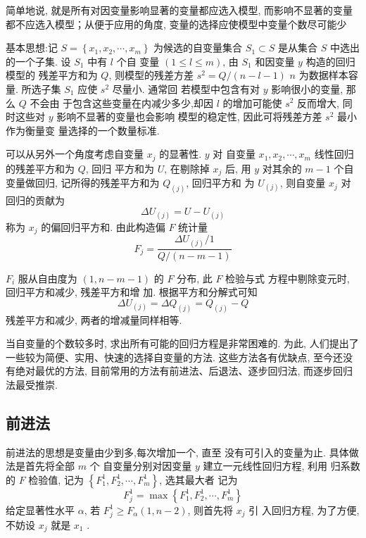 简单地说, 就是所有对因变量影响显著的变量都应选入模型, 而影响不显著的变量都不应选入模型；从便于应用的角度, 变量的选择应使模型中变量个数尽可能少

基本思想:记 \( {S}=\left\{{x}_{1}, {x}_{2}, \cdots, {x}_{m}\right\} \) 为候选的自变量集合
\( {S}_{1} \subset {S} \) 是从集合 \( {S} \) 中选出的一个子集. 设 \( {S}_{1} \) 中有 \( {l} \) 个自
变量 \( (1 \leq l \leq m) \), 由 \( S_{1} \) 和因变量 \( y \) 构造的回归模型的 残差平方和为 \( Q \), 则模型的残差方差 \( {s}^{2}={Q} /({n}-{l}-{1}) \)
\( {n} \) 为数据样本容量. 所选子集 \( {S}_{1} \) 应使 \( {s}^{2} \) 尽量小. 通常回
若模型中包含有对 \( y \) 影响很小的变量, 那么 \( Q \) 不会由 于包含这些变量在内减少多少,却因 \( l \) 的增加可能使 \( s^{2} \) 反而增大, 同时这些对 \( {y} \) 影响不显著的变量也会影响 模型的稳定性, 因此可将残差方差 \( {s}^{2} \) 最小作为衡量变
量选择的一个数量标准. 

可以从另外一个角度考虑自变量 \( {x}_{j} \) 的显著性.  \( {y} \) 对 自变量 \( {x}_{{1}}, {x}_{2}, \cdots, {x}_{m} \) 线性回归的残差平方和为 \( {Q} \), 回归
平方和为 \( U \), 在剔除掉 \( {x}_{j} \) 后, 用 \( {y} \) 对其余的 \( {m}-{1} \) 个自变量做回归, 记所得的残差平方和为 $ Q_{(j)} $, 回归平方和
为 \( U_{(j)} \), 则自变量 \( x_{j} \) 对回归的贡献为
$$
\Delta {U}_{(j)}={U}-{U}_{(j)}
$$
称为 \( {x}_{{j}} \) 的偏回归平方和. 由此构造偏 \( {F} \) 统计量
$$
F_{j}=\frac{\Delta U_{(j)} / 1}{Q /(n-m-1)}
$$

\( {F}_{i} \) 服从自由度为 \( ({1}, {n}-{m}-{1}) \) 的 \( {F} \) 分布, 此 \( {F} \) 检验与式
方程中剔除变元时, 回归平方和减少, 残差平方和增 加. 根据平方和分解式可知
$$
\Delta {U}_{(j)}=\Delta {Q}_{(j)}={Q}_{(j)}-{Q}
$$
残差平方和减少, 两者的增减量同样相等. 

当自变量的个数较多时, 求出所有可能的回归方程是非常困难的. 为此, 人们提出了一些较为简便、实用、快速的选择自变量的方法. 这些方法各有优缺点, 至今还没有绝对最优的方法, 目前常用的方法有前进法、后退法、逐步回归法, 而逐步回归法最受推崇. 

\subsection{前进法}

前进法的思想是变量由少到多,每次增加一个, 直至
没有可引入的变量为止. 具体做法是首先将全部 \( {m} \) 个 自变量分别对因变量 \( {y} \) 建立一元线性回归方程, 利用
归系数的 \( F \) 检验值, 记为 \( \left\{F_{1}^{1}, F_{2}^{1}, \cdots, F_{m}^{1}\right\} \), 选其最大者 记为
$$
F_{j}^{1}=\max \left\{F_{1}^{1}, F_{2}^{1}, \cdots, F_{m}^{1}\right\}
$$
给定显著性水平 \( \alpha \), 若 \( F_{j}^{1} \geq F_{\alpha}(1, n-2) \), 则首先将 \( {x}_{j} \) 引 入回归方程, 为了方便, 不妨设 \( {x}_{j} \) 就是 \( {x}_{1} \) . 

